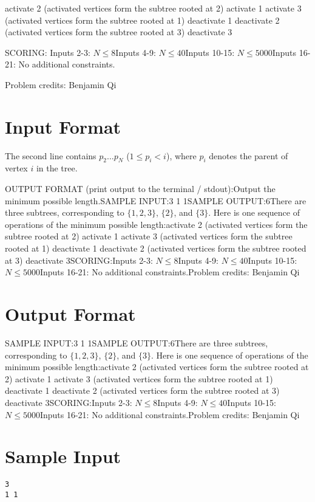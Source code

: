 \documentclass[12pt]{article}
\begin{document}
activate 2
(activated vertices form the subtree rooted at 2)
activate 1
activate 3
(activated vertices form the subtree rooted at 1)
deactivate 1
deactivate 2
(activated vertices form the subtree rooted at 3)
deactivate 3

SCORING:
Inputs 2-3: $N \le 8$Inputs 4-9: $N \le 40$Inputs 10-15: $N \le 5000$Inputs 16-21: No  additional constraints.


Problem credits: Benjamin Qi



\section*{Input Format}
The second line contains $p_2 \dots p_N$ ($1\le p_i<i$), where $p_i$ denotes the
parent of vertex $i$ in the tree.

OUTPUT FORMAT (print output to the terminal / stdout):Output the minimum possible length.SAMPLE INPUT:3
1 1SAMPLE OUTPUT:6There are three subtrees, corresponding to $\{1,2,3\}$, $\{2\}$, and $\{3\}$.
Here is one sequence of operations of the minimum possible length:activate 2
(activated vertices form the subtree rooted at 2)
activate 1
activate 3
(activated vertices form the subtree rooted at 1)
deactivate 1
deactivate 2
(activated vertices form the subtree rooted at 3)
deactivate 3SCORING:Inputs 2-3: $N \le 8$Inputs 4-9: $N \le 40$Inputs 10-15: $N \le 5000$Inputs 16-21: No  additional constraints.Problem credits: Benjamin Qi

\section*{Output Format}
SAMPLE INPUT:3
1 1SAMPLE OUTPUT:6There are three subtrees, corresponding to $\{1,2,3\}$, $\{2\}$, and $\{3\}$.
Here is one sequence of operations of the minimum possible length:activate 2
(activated vertices form the subtree rooted at 2)
activate 1
activate 3
(activated vertices form the subtree rooted at 1)
deactivate 1
deactivate 2
(activated vertices form the subtree rooted at 3)
deactivate 3SCORING:Inputs 2-3: $N \le 8$Inputs 4-9: $N \le 40$Inputs 10-15: $N \le 5000$Inputs 16-21: No  additional constraints.Problem credits: Benjamin Qi

\section*{Sample Input}
\begin{verbatim}
3
1 1
\end{verbatim}
\end{document}
